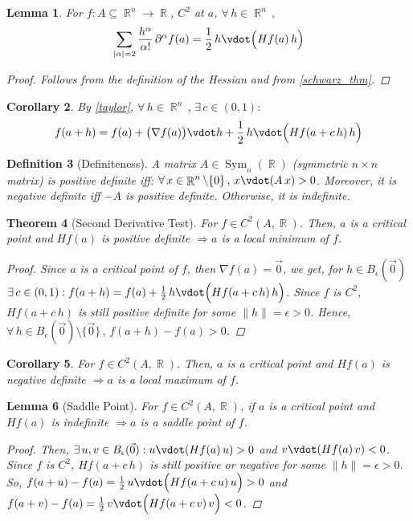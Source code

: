 \documentclass[12pt]{article}
\let\RA\Rightarrow
\renewcommand{\grad}{\nabla}
\newcommand{\Forall}[1]{\forall\,{#1}\,,\,}
\newcommand{\Exist}[1]{\exists\,{#1}:}
\DeclareMathOperator{\R}{\mathbb{R}}
\newtheorem{theorem}{Theorem}[subsection]
\newtheorem{definition}[theorem]{Definition}
\newtheorem{lemma}[theorem]{Lemma}
\newtheorem{corollary}[theorem]{Corollary}
\begin{document}
\begin{lemma}
  For $f:A\subseteq\R^n\to\R$, $C^2$ at $a$, $\Forall{h\in\R^n}$
  $$\sum_{|\alpha|=2}\frac{h^\alpha}{\alpha!}\,\partial^\alpha f(a)=\frac{1}{2}\,h\vdot\Big(Hf(a)\,h\Big)$$
  \begin{proof}
    Follows from the definition of the Hessian and from \ref{schwarz_thm}.
  \end{proof}
\end{lemma}

\begin{corollary}
  By \ref{taylor}, $\Forall{h\in\R^n}\Exist{c\in (0,1)}$ $$f(a+h)=f(a)+\big(\grad f(a)\big)\vdot h+\frac{1}{2}\,h\vdot\Big(Hf(a+c\,h)\,h\Big)$$
\end{corollary}

\begin{definition}[Definiteness]
  A matrix $A\in \operatorname{Sym}_n(\R)$ (symmetric $n\times n$ matrix) is positive definite iff: $\Forall{x\in\R^n\setminus\{0\}}x\vdot(A\,x)>0$. Moreover, it is negative definite iff $-A$ is positive definite. Otherwise, it is indefinite.
\end{definition}

\begin{theorem}[Second Derivative Test]
  For $f\in C^2(A,\R)$. Then, $a$ is a critical point and $Hf(a)$ is positive definite $\RA a$ is a local minimum of $f$.
  \begin{proof}
    Since $a$ is a critical point of $f$, then $\grad f(a)=\vec{0}$, we get, for $h\in B_\epsilon(\vec{0})$ $\Exist{c\in (0,1)}f(a+h)=f(a)+\frac{1}{2}\,h\vdot\Big(Hf(a+c\,h)\,h\Big)$. Since $f$ is $C^2$, $Hf(a+c\,h)$ is still positive definite for some $\|h\|=\epsilon>0$. Hence, $\Forall{h\in B_\epsilon(\vec{0})\setminus\{\vec{0}\}}f(a+h)-f(a)>0$.
  \end{proof}
\end{theorem}

\begin{corollary}
  For $f\in C^2(A,\R)$. Then, $a$ is a critical point and $Hf(a)$ is negative definite $\RA a$ is a local maximum of $f$.
\end{corollary}

\begin{lemma}[Saddle Point]
  For $f\in C^2(A,\R)$, if $a$ is a critical point and $Hf(a)$ is indefinite $\RA a$ is a saddle point of $f$.
  \begin{proof}
    Then, $\Exist{u,v\in B_\epsilon(\vec{0})}u\vdot(Hf(a)\,u)>0 $ and $v\vdot(Hf(a)\,v)<0$. Since $f$ is $C^2$, $Hf(a+c\,h)$ is still positive or negative for some $\|h\|=\epsilon>0$. So, $f(a+u)-f(a)=\frac{1}{2}\,u\vdot\Big(Hf(a+c\,u)\,u\Big)>0$ and $f(a+v)-f(a)=\frac{1}{2}\,v\vdot\Big(Hf(a+c\,v)\,v\Big)<0$.
  \end{proof}
\end{lemma}
\end{document}
